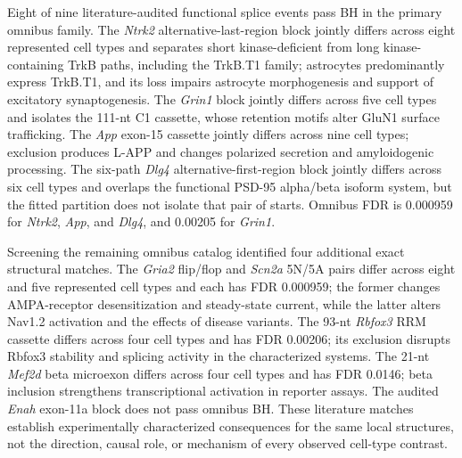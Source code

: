 \documentclass[11pt]{article}
\begin{document}
Eight of nine literature-audited functional splice events pass BH in the primary omnibus family. The \emph{Ntrk2} alternative-last-region block jointly differs across eight represented cell types and separates short kinase-deficient from long kinase-containing TrkB paths, including the TrkB.T1 family; astrocytes predominantly express TrkB.T1, and its loss impairs astrocyte morphogenesis and support of excitatory synaptogenesis. The \emph{Grin1} block jointly differs across five cell types and isolates the 111-nt C1 cassette, whose retention motifs alter GluN1 surface trafficking. The \emph{App} exon-15 cassette jointly differs across nine cell types; exclusion produces L-APP and changes polarized secretion and amyloidogenic processing. The six-path \emph{Dlg4} alternative-first-region block jointly differs across six cell types and overlaps the functional PSD-95 alpha/beta isoform system, but the fitted partition does not isolate that pair of starts. Omnibus FDR is 0.000959 for \emph{Ntrk2}, \emph{App}, and \emph{Dlg4}, and 0.00205 for \emph{Grin1}.

Screening the remaining omnibus catalog identified four additional exact structural matches. The \emph{Gria2} flip/flop and \emph{Scn2a} 5N/5A pairs differ across eight and five represented cell types and each has FDR 0.000959; the former changes AMPA-receptor desensitization and steady-state current, while the latter alters Nav1.2 activation and the effects of disease variants. The 93-nt \emph{Rbfox3} RRM cassette differs across four cell types and has FDR 0.00206; its exclusion disrupts Rbfox3 stability and splicing activity in the characterized systems. The 21-nt \emph{Mef2d} beta microexon differs across four cell types and has FDR 0.0146; beta inclusion strengthens transcriptional activation in reporter assays. The audited \emph{Enah} exon-11a block does not pass omnibus BH. These literature matches establish experimentally characterized consequences for the same local structures, not the direction, causal role, or mechanism of every observed cell-type contrast.
\end{document}

